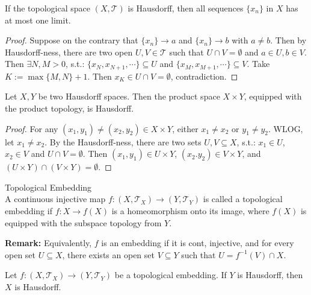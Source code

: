 \begin{proposition}
    If the topological space $(X,\mathcal{T})$ is Hausdorff, then all sequences $\{x_n\}$ in $X$ has at most one limit.
\end{proposition}

\begin{proof}
    Suppose on the contrary that $\{x_n\} \rightarrow a$ and $\{x_n\} \rightarrow b$ with $a \neq b$. Then by Hausdorff-ness, there are two open $U,V \in \mathcal{T}$ such that $U\cap V =\emptyset$ and $a \in U, b\in V$.
    Then $\exists N,M>0$, s.t.: $\{x_N,x_{N+1},\cdots\} \subseteq U$ and $\{x_M,x_{M+1},\cdots\} \subseteq V$. Take $K :=\max \{M,N\}+1$. Then $x_K \in U \cap V = \emptyset$, contradiction.
\end{proof}

\begin{proposition}
    Let $X,Y$ be two Hausdorff spaces. Then the product space $X\times Y$, equipped with the product topology, is Hausdorff.
\end{proposition}

\begin{proof}
    For any $(x_1,y_1) \neq (x_2,y_2) \in X\times Y$, either $x_1\neq x_2$ or $y_1 \neq y_2$. WLOG, let $x_1 \neq x_2$. By the Hausdorff-ness, there are two sets $U,V \subseteq X$, s.t.: $x_1 \in U$, $x_2 \in V$ and $U\cap V=\emptyset$. Then $(x_1,y_1) \in U\times Y$, $(x_2.y_2) \in V\times Y$, and $(U\times Y) \cap (V\times Y)=\emptyset$.
\end{proof}

\begin{definition}{Topological Embedding}\\
A continuous injective map $f: (X,\mathcal{T}_X) \rightarrow (Y,\mathcal{T}_Y)$ is called a topological embedding if $f: X \rightarrow f(X)$ is a homeomorphism onto its image, where $f(X)$ is equipped with the subspace topology from $Y$.
\end{definition}

\noindent\textbf{Remark:} Equivalently, $f$ is an embedding if it is cont, injective, and for every open set $U \subseteq X$, there exists an open set $V \subseteq Y$ such that $U = f^{-1}(V) \cap X$.

\begin{proposition}
    Let $f: (X,\mathcal{T}_X) \rightarrow (Y,\mathcal{T}_Y)$ be a topological embedding. If $Y$ is Hausdorff, then $X$ is Hausdorff.
\end{proposition}

